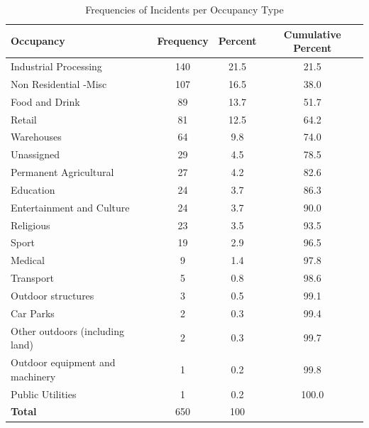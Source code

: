 \documentclass[a4paper,oneside]{book}
\begin{document}
\begin{table}[htbp]
	\centering
	\begin{tabular}{|l|c|c|c|}
	\hline
	\textbf{Occupancy}	&\textbf{Frequency}	&\textbf{Percent}	&\textbf{Cumulative Percent}	\\
	\hline
	Industrial Processing	&140	&21.5	&21.5	\\
	Non Residential -Misc	&107	&16.5	&38.0	\\
	Food and Drink	&89	&13.7	&51.7	\\
	Retail	&81	&12.5	&64.2	\\
	Warehouses	&64	&9.8	&74.0	\\
	Unassigned	&29	&4.5	&78.5	\\
	Permanent Agricultural	&27	&4.2	&82.6	\\
	Education	&24	&3.7	&86.3	\\
	Entertainment and Culture	&24	&3.7	&90.0	\\
	Religious	&23	&3.5	&93.5	\\
	Sport	&19	&2.9	&96.5	\\
	Medical	&9	&1.4	&97.8	\\
	Transport	&5	&0.8	&98.6	\\
	Outdoor structures	&3	&0.5	&99.1	\\
	Car Parks	&2	&0.3	&99.4	\\
	Other outdoors (including land)	&2	&0.3	&99.7	\\
	Outdoor equipment and machinery	&1	&0.2	&99.8	\\
	Public Utilities	&1	&0.2	&100.0	\\
	\hline
	\textbf{Total}	&650	&100	&	\\
	\hline
	\end{tabular}
	\caption{Frequencies of Incidents per Occupancy Type}
	\label{tab:Incident_Frequency}
\end{table}
\end{document}
